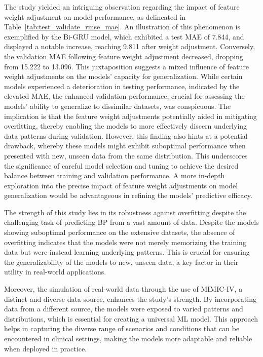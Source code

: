 The study yielded an intriguing observation regarding the impact of feature weight adjustment on model performance, as delineated in Table~\ref{tab:test_validate_rmse_mae}.
An illustration of this phenomenon is exemplified by the Bi-GRU model, which exhibited a test MAE of 7.844, and displayed a notable increase, reaching 9.811 after weight adjustment.
Conversely, the validation MAE following feature weight adjustment decreased, dropping from 15.222 to 13.096.
This juxtaposition suggests a mixed influence of feature weight adjustments on the models' capacity for generalization.
While certain models experienced a deterioration in testing performance, indicated by the elevated MAE, the enhanced validation performance,
crucial for assessing the models' ability to generalize to dissimilar datasets, was conspicuous.
The implication is that the feature weight adjustments potentially aided in mitigating overfitting, thereby enabling the models to more effectively discern underlying data patterns during validation.
However, this finding also hints at a potential drawback, whereby these models might exhibit suboptimal performance when presented with new, unseen data from the same distribution.
This underscores the significance of careful model selection and tuning to achieve the desired balance between training and validation performance.
A more in-depth exploration into the precise impact of feature weight adjustments on model generalization would be advantageous in refining the models' predictive efficacy.

The strength of this study lies in its robustness against overfitting despite the challenging task of predicting BP from a vast amount of data.
Despite the models showing suboptimal performance on the extensive datasets, the absence of overfitting indicates that the models were not merely memorizing the training data but were instead learning underlying patterns.
This is crucial for ensuring the generalizability of the models to new, unseen data, a key factor in their utility in real-world applications.

Moreover, the simulation of real-world data through the use of MIMIC-IV, a distinct and diverse data source, enhances the study's strength.
By incorporating data from a different source, the models were exposed to varied patterns and distributions, which is essential for creating a universal ML model.
This approach helps in capturing the diverse range of scenarios and conditions that can be encountered in clinical settings, making the models more adaptable and reliable when deployed in practice.
